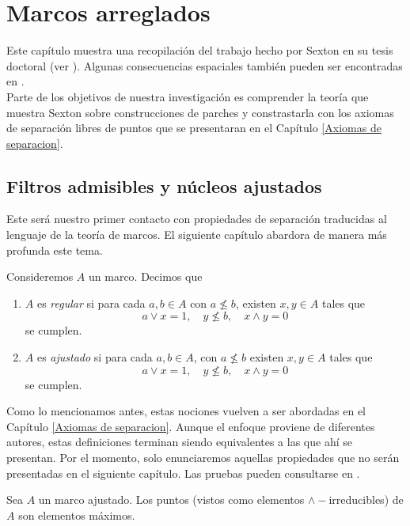 \chapter{Marcos arreglados}\label{Parches}

Este capítulo muestra una recopilación del trabajo hecho por Sexton en su tesis doctoral (ver \cite{R.S.}). 
Algunas consecuencias espaciales también pueden ser encontradas en \cite{R.S.3}.\\

Parte de los objetivos de nuestra investigación es comprender la teoría que muestra Sexton sobre construcciones de parches 
y constrastarla con los axiomas de separación libres de puntos que se presentaran en el Capítulo \ref{Axiomas de separacion}.

\section{Filtros admisibles y núcleos ajustados}
Este será nuestro primer contacto con propiedades de separación traducidas al lenguaje de la teoría de marcos. El siguiente capítulo abardora de manera 
más profunda este tema.

\begin{dfn}
Consideremos $A$ un marco. Decimos que 
\begin{enumerate}
\item $A$ es \emph{regular} si para cada $a,b\in A$ con $a\nleq b$, existen $x,y\in A$ tales que 
\[
a\vee x=1, \quad y\nleq b, \quad x\wedge y=0
\]
se cumplen.
\item $A$ es \emph{ajustado} si para cada $a, b\in A$, con $a\nleq b$ existen $x, y\in A$ tales que
\[
a\vee x=1,\quad y\nleq b, \quad x\wedge y=0
\]
se cumplen.
\end{enumerate}
\end{dfn}

Como lo mencionamos antes, estas nociones vuelven a ser abordadas en el Capítulo \ref{Axiomas de separacion}. Aunque el enfoque proviene de diferentes autores, estas definiciones terminan siendo equivalentes a las que ahí se presentan. Por el momento, solo enunciaremos aquellas propiedades que no serán presentadas en el siguiente 
capítulo. Las pruebas pueden consultarse en \cite{R.S.}.

\begin{lem}
    Sea $A$ un marco ajustado. Los puntos (vistos como elementos $\wedge-$irreducibles) de $A$ son elementos máximos.
\end{lem}

